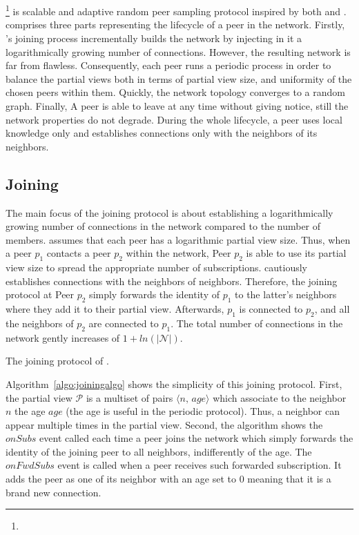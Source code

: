 
\section{\SCAMPLON{}}
\label{sec:proposal}

\SCAMPLON{}\footnote{\SCAMPLONDESCRIPTION{}} is scalable and adaptive random
peer sampling protocol inspired by both \SCAMP{} and \CYCLON{}. \SCAMPLON{}
comprises three parts representing the lifecycle of a peer in the network.
Firstly, \SCAMPLON{}'s joining process incrementally builds the network by
injecting in it a logarithmically growing number of connections. However, the
resulting network is far from flawless. Consequently, each peer runs a periodic
process in order to balance the partial views both in terms of partial view
size, and uniformity of the chosen peers within them. Quickly, the network
topology converges to a random graph. Finally, A peer is able to leave at any
time without giving notice, still the network properties do not degrade. During
the whole lifecycle, a peer uses local knowledge only and establishes
connections only with the neighbors of its neighbors.

\subsection{Joining}

The main focus of the joining protocol is about establishing a logarithmically
growing number of connections in the network compared to the number of members.
\SCAMPLON{} assumes that each peer has a logarithmic partial view size. Thus,
when a peer $p_1$ contacts a peer $p_2$ within the network, Peer $p_2$ is able
to use its partial view size to spread the appropriate number of subscriptions.
\SCAMPLON{} cautiously establishes connections with the neighbors of
neighbors. Therefore, the joining protocol at Peer $p_2$ simply forwards the
identity of $p_1$ to the latter's neighbors where they add it to their partial
view. Afterwards, $p_1$ is connected to $p_2$, and all the neighbors of $p_2$
are connected to $p_1$. The total number of connections in the network gently
increases of $1+ln(|\mathcal{N}|)$.

\begin{algorithm}

\caption{\label{algo:joiningalgo}The joining protocol of \SCAMPLON{}.}
\end{algorithm}

Algorithm~\ref{algo:joiningalgo} shows the simplicity of this joining
protocol. First, the partial view $\mathcal{P}$ is a multiset of pairs
$\langle n,\, age\rangle$ which associate to the neighbor $n$ the age $age$
(the age is useful in the periodic protocol). Thus, a neighbor can appear
multiple times in the partial view. Second, the algorithm shows the $onSubs$
event called each time a peer joins the network which simply forwards the
identity of the joining peer to all neighbors, indifferently of the age. The
$onFwdSubs$ event is called when a peer receives such forwarded
subscription. It adds the peer as one of its neighbor with an age set to $0$
meaning that it is a brand new connection.

